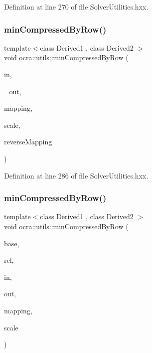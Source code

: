 Definition at line 270 of file Solver\+Utilities.\+hxx.

\hypertarget{namespaceocra_1_1utils_ae8dc2eb14db238a75ea0a8bf499e4902}{}\label{namespaceocra_1_1utils_ae8dc2eb14db238a75ea0a8bf499e4902} 
\subsubsection{\texorpdfstring{min\+Compressed\+By\+Row()}{minCompressedByRow()}\hspace{0.1cm}{\footnotesize\ttfamily [1/2]}}
{\footnotesize\ttfamily template$<$class Derived1 , class Derived2 $>$ \\
void ocra\+::utils\+::min\+Compressed\+By\+Row (\begin{DoxyParamCaption}\item[{const Matrix\+Base$<$ Derived1 $>$ \&}]{in,  }\item[{Matrix\+Base$<$ Derived2 $>$ const \&}]{\+\_\+out,  }\item[{const std\+::vector$<$ int $>$ \&}]{mapping,  }\item[{double}]{scale,  }\item[{bool}]{reverse\+Mapping }\end{DoxyParamCaption})\hspace{0.3cm}{\ttfamily [inline]}}



Definition at line 286 of file Solver\+Utilities.\+hxx.

\hypertarget{namespaceocra_1_1utils_af79aa2317a885467a28ba54e7b287ec8}{}\label{namespaceocra_1_1utils_af79aa2317a885467a28ba54e7b287ec8} 
\subsubsection{\texorpdfstring{min\+Compressed\+By\+Row()}{minCompressedByRow()}\hspace{0.1cm}{\footnotesize\ttfamily [2/2]}}
{\footnotesize\ttfamily template$<$class Derived1 , class Derived2 $>$ \\
void ocra\+::utils\+::min\+Compressed\+By\+Row (\begin{DoxyParamCaption}\item[{const \hyperlink{classocra_1_1Variable}{Variable} \&}]{base,  }\item[{const \hyperlink{classocra_1_1Variable}{Variable} \&}]{rel,  }\item[{const Matrix\+Base$<$ Derived1 $>$ \&}]{in,  }\item[{Matrix\+Base$<$ Derived2 $>$ const \&}]{out,  }\item[{std\+::vector$<$ int $>$ \&}]{mapping,  }\item[{double}]{scale }\end{DoxyParamCaption})\hspace{0.3cm}{\ttfamily [inline]}}



